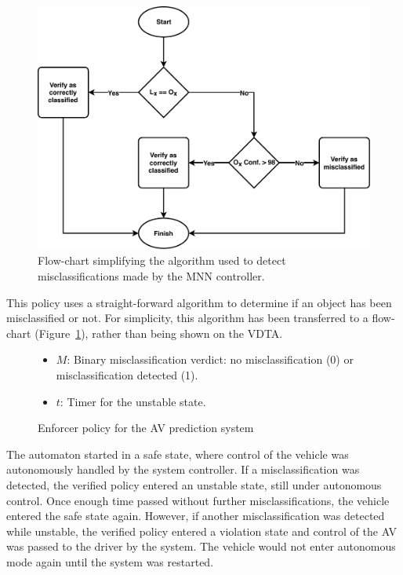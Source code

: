 \begin{figure}[h]
	\centering
	\includegraphics[width=\textwidth]{Content/fig/flow-misclassify.pdf}
	\caption{Flow-chart simplifying the algorithm used to detect misclassifications made by the \ac{MNN} controller.} \label{fig:flow}
\end{figure}

This policy uses a straight-forward algorithm to determine if an object has been misclassified or not.
For simplicity, this algorithm has been transferred to a flow-chart (Figure~\ref{fig:flow}), rather than being shown on the \ac{VDTA}.

\begin{figure}[h]
	\centering
	\scalebox{1}{}
	\begin{itemize}
		\item $M$: Binary misclassification verdict: no misclassification (0) or misclassification detected (1).
		\item $t$: Timer for the unstable state.
	\end{itemize}
	
	\caption{Enforcer policy for the \acf{AV} prediction system}
	\label{fig:signrte}
\end{figure}

The automaton started in a safe state, where control of the vehicle was autonomously handled by the system controller.
If a misclassification was detected, the verified policy entered an unstable state, still under autonomous control. 
Once enough time passed without further misclassifications, the vehicle entered the safe state again.
However, if another misclassification was detected while unstable, the verified policy entered a violation state and control of the \ac{AV} was passed to the driver by the system.
The vehicle would not enter autonomous mode again until the system was restarted.






